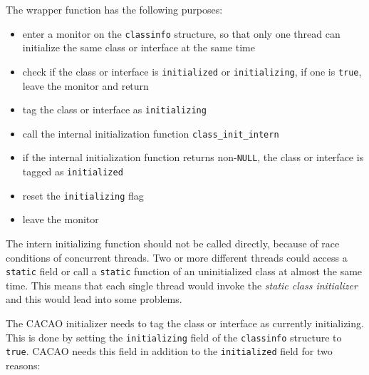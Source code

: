 The wrapper function has the following purposes:

\begin{itemize}
 \item enter a monitor on the \texttt{classinfo} structure, so that
 only one thread can initialize the same class or interface at the
 same time

 \item check if the class or interface is \texttt{initialized} or
 \texttt{initializing}, if one is \texttt{true}, leave the monitor and
 return

 \item tag the class or interface as \texttt{initializing}

 \item call the internal initialization function
 \texttt{class\_init\_intern}

 \item if the internal initialization function returns
 non-\texttt{NULL}, the class or interface is tagged as
 \texttt{initialized}

 \item reset the \texttt{initializing} flag

 \item leave the monitor
\end{itemize}

The intern initializing function should not be called directly,
because of race conditions of concurrent threads. Two or more
different threads could access a \texttt{static} field or call a
\texttt{static} function of an uninitialized class at almost the same
time. This means that each single thread would invoke the
\textit{static class initializer} and this would lead into some
problems.

The CACAO initializer needs to tag the class or interface as currently
initializing. This is done by setting the \texttt{initializing} field
of the \texttt{classinfo} structure to \texttt{true}. CACAO needs this
field in addition to the \texttt{initialized} field for two reasons:

